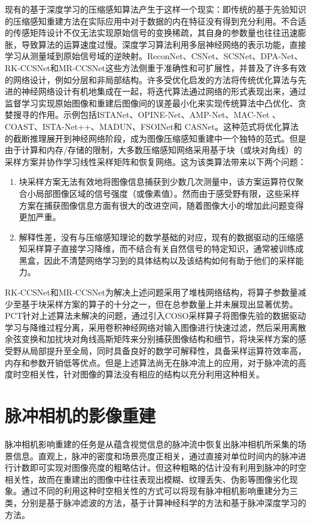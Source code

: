 现有的基于深度学习的压缩感知算法产生于这样一个现实：即传统的基于先验知识的压缩感知重建方法在实际应用中对于数据的内在特征没有得到充分利用。不合适的传感矩阵设计不仅无法实现原始信号的变换稀疏，其自身的参数量也往往迅速膨胀，导致算法的运算速度过慢。深度学习算法利用多层神经网络的表示功能，直接学习从测量域到原始信号域的逆映射。ReconNet\cite{ReconNet}、CSNet\cite{CSNET}、SCSNet\cite{SCSNET}、DPA-Net\cite{DPA-Net}、RK-CCSNet\cite{RK-CCSNet}和MR-CCSNet\cite{MR-CCSNet}这些方法侧重于准确性和可扩展性，并普及了许多有效的网络设计，例如分层和非局部结构。许多受优化启发的方法将传统优化算法与先进的神经网络设计有机地集成在一起，将迭代算法通过网络的形式表现出来，通过监督学习实现原始图像和重建后图像间的误差最小化来实现传统算法中凸优化、贪婪搜寻的作用。示例包括ISTANet\cite{ISTA-Net}、OPINE-Net\cite{OPINE-NET}、AMP-Net\cite{AMP-NET}、MAC-Net\cite{MAC-Net} 、COAST\cite{COAST}、ISTA-Net++\cite{ISTA-Net++}、MADUN\cite{MADUN}、FSOINet\cite{FSOINET}和 CASNet\cite{CASNET}。这种范式将优化算法的截断推理展开到神经网络阶段，成为图像压缩感知重建中一个独特的范式。但是由于计算和内存/存储的限制，大多数压缩感知网络采用基于块（或块对角线）的采样方案并协作学习线性采样矩阵和恢复网络。这为该类算法带来以下两个问题：
\begin{enumerate}
  \item 块采样方案\cite{Block_Compressed}无法有效地将图像信息捕获到少数几次测量中，该方案运算符仅聚合小局部图像区域的信号强度（或像素值）。然而由于感受野有限，这些采样方案在捕获图像信息方面有很大的改进空间，随着图像大小的增加此问题变得更加严重。
  \item 解释性差，没有与压缩感知理论的数学基础的对应，现有的数据驱动的压缩感知采样算子直接学习降维，而不结合有关自然信号的特定知识，通常被训练成黑盒，因此不清楚网络学习到的具体结构以及该结构如何有助于他们的采样能力。
\end{enumerate}

RK-CCSNet\cite{RK-CCSNet}和MR-CCSNet\cite{MR-CCSNet}为解决上述问题采用了堆栈网络结构，将算子参数量减少至基于块采样方案的算子的十分之一，但在总参数量上并未展现出显著优势。PCT针对上述算法未解决的问题，通过引入COSO\cite{Practical_compact_deep_compressed_sensing}采样算子将图像先验的数据驱动学习与降维过程分离，采用卷积神经网络对输入图像进行快速过滤，然后采用离散余弦变换和加扰块对角线高斯矩阵来分别捕获图像结构和细节，将块采样方案的感受野从局部提升至全局，同时具备良好的数学可解释性，具备采样运算符效率高，内存和参数开销低等优点。但是上述算法尚无在脉冲流上的应用，对于脉冲流的高度时空相关性，针对图像的算法没有相应的结构以充分利用这种相关。

\section{脉冲相机的影像重建}
脉冲相机影响重建的任务是从蕴含视觉信息的脉冲流中恢复出脉冲相机所采集的场景信息。直观上，脉冲的密度和场景亮度正相关，通过直接对单位时间内的脉冲进行计数即可实现对图像亮度的粗略估计。但这种粗略的估计没有利用到脉冲的时空相关性，故而在重建出的图像中往往表现出模糊、纹理丢失、伪影等图像劣化现象。通过不同的利用这种时空相关性的方式可以将现有脉冲相机影响重建分为三类，分别是基于脉冲滤波的方法，基于计算神经科学的方法和基于脉冲深度学习的方法。

